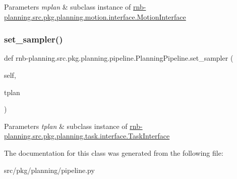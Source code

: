 \begin{DoxyParams}{Parameters}
{\em mplan} & subclass instance of \hyperlink{classrnb-planning_1_1src_1_1pkg_1_1planning_1_1motion_1_1interface_1_1_motion_interface}{rnb-\/planning.\+src.\+pkg.\+planning.\+motion.\+interface.\+Motion\+Interface} \\
\hline
\end{DoxyParams}
\mbox{\label{classrnb-planning_1_1src_1_1pkg_1_1planning_1_1pipeline_1_1_planning_pipeline_a054a0d7395e4b63071c5dc751895d32f}} 
\subsubsection{\texorpdfstring{set\+\_\+sampler()}{set\_sampler()}}
{\footnotesize\ttfamily def rnb-\/planning.\+src.\+pkg.\+planning.\+pipeline.\+Planning\+Pipeline.\+set\+\_\+sampler (\begin{DoxyParamCaption}\item[{}]{self,  }\item[{}]{tplan }\end{DoxyParamCaption})}


\begin{DoxyParams}{Parameters}
{\em tplan} & subclass instance of \hyperlink{classrnb-planning_1_1src_1_1pkg_1_1planning_1_1task_1_1interface_1_1_task_interface}{rnb-\/planning.\+src.\+pkg.\+planning.\+task.\+interface.\+Task\+Interface} \\
\hline
\end{DoxyParams}


The documentation for this class was generated from the following file\+:\begin{DoxyCompactItemize}
\item 
src/pkg/planning/pipeline.\+py\end{DoxyCompactItemize}
